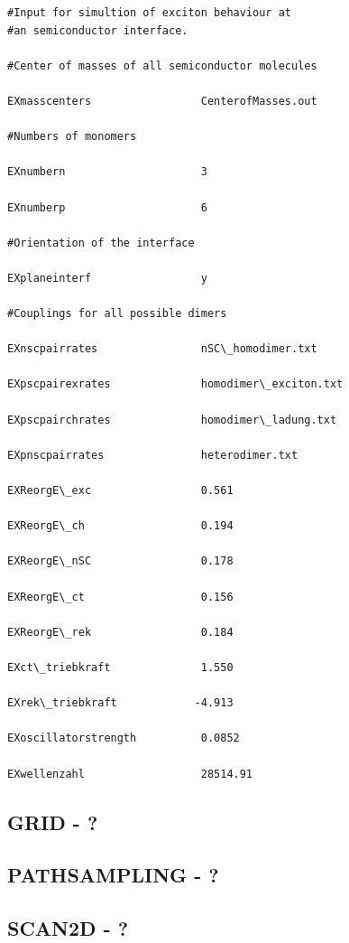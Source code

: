 \documentclass[10pt,a4paper]{article} %
\begin{document}
\begin{lstlisting}
#Input for simultion of exciton behaviour at 
#an semiconductor interface.

#Center of masses of all semiconductor molecules

EXmasscenters                 CenterofMasses.out

#Numbers of monomers

EXnumbern                     3

EXnumberp                     6

#Orientation of the interface

EXplaneinterf                 y

#Couplings for all possible dimers

EXnscpairrates                nSC\_homodimer.txt

EXpscpairexrates              homodimer\_exciton.txt

EXpscpairchrates              homodimer\_ladung.txt

EXpnscpairrates               heterodimer.txt

EXReorgE\_exc                 0.561

EXReorgE\_ch                  0.194

EXReorgE\_nSC                 0.178

EXReorgE\_ct                  0.156

EXReorgE\_rek                 0.184

EXct\_triebkraft              1.550

EXrek\_triebkraft            -4.913

EXoscillatorstrength          0.0852

EXwellenzahl                  28514.91
\end{lstlisting}	
	
	\subsection{GRID - ?}	
	
	\subsection{PATHSAMPLING - ?}	
	
	\subsection{SCAN2D - ?}	
	
\end{document}
